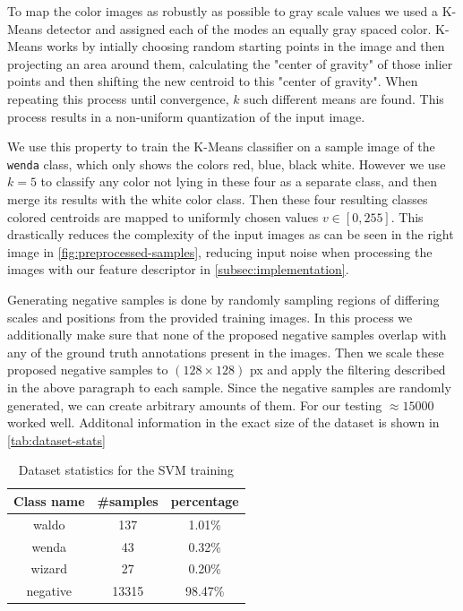 \documentclass[11pt]{article}
\begin{document}
To map the color images as robustly as possible to gray scale values we used a K-Means detector 
and assigned each of the modes an equally gray spaced color. 
K-Means works by intially choosing random starting points in the image and then projecting an area around them, calculating the "center of gravity"
of those inlier points and then shifting the new centroid to this "center of gravity". When repeating this
process until convergence, \( k \) such different means are found. This process results in a non-uniform quantization of the input image.

We use this property to train the K-Means classifier on a sample image of the \verb|wenda| class, which only 
shows the colors red, blue, black white. However we use \( k=5 \) to classify any color not lying in these four as a separate class, and then merge 
its results with the white color class. Then these four resulting classes colored centroids are mapped to uniformly
chosen values \( v \in [0, 255] \). This drastically reduces the complexity of the input images as can be seen in the right image in \autoref{fig:preprocessed-samples},
reducing input noise when processing the images with our feature descriptor in \autoref{subsec:implementation}.

\vspace{0.5cm}
Generating negative samples is done by randomly sampling regions of differing scales and positions from the provided training images.
In this process we additionally make sure that none of the proposed negative samples overlap with any of the ground truth annotations present in the images.
Then we scale these proposed negative samples to \( (128 \times 128 ) \) px and apply the filtering described in the above paragraph to each sample.
Since the negative samples are randomly generated, we can create arbitrary amounts of them. 
For our testing \( \approx15000 \) worked well. 
Additonal information in the exact size of the dataset is shown in \autoref{tab:dataset-stats}

\begin{table}[]
    \centering
    \begin{tabular}{ccc}
        \toprule
        Class name & \#samples & percentage \\
        \midrule
        waldo & 137 &  1.01\% \\
        wenda & 43&  0.32\% \\
        wizard& 27&  0.20\% \\
        negative & 13315&  98.47\% \\
        \bottomrule
    \end{tabular}
    \caption{Dataset statistics for the SVM training}
    \label{tab:dataset-stats}
\end{table}
\end{document}
